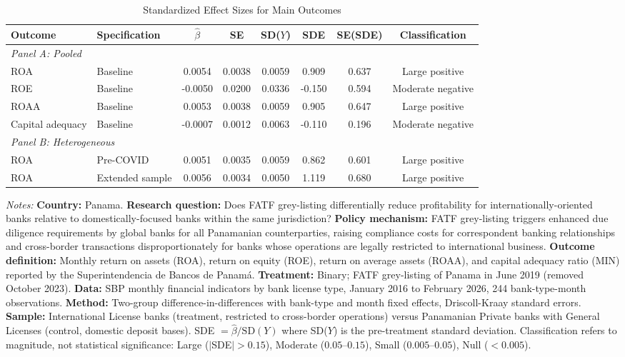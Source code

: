 \begin{table}[H]
\centering
\caption{Standardized Effect Sizes for Main Outcomes}
\label{tab:sde}
\begin{adjustbox}{max width=\textwidth}
\begin{threeparttable}
\begin{tabular}{llcccccc}
\toprule
Outcome & Specification & $\hat{\beta}$ & SE & SD($Y$) & SDE & SE(SDE) & Classification \\
\midrule
\multicolumn{8}{l}{\textit{Panel A: Pooled}} \\
ROA & Baseline & 0.0054 & 0.0038 & 0.0059 & 0.909 & 0.637 & Large positive \\
ROE & Baseline & -0.0050 & 0.0200 & 0.0336 & -0.150 & 0.594 & Moderate negative \\
ROAA & Baseline & 0.0053 & 0.0038 & 0.0059 & 0.905 & 0.647 & Large positive \\
Capital adequacy & Baseline & -0.0007 & 0.0012 & 0.0063 & -0.110 & 0.196 & Moderate negative \\
\midrule
\multicolumn{8}{l}{\textit{Panel B: Heterogeneous}} \\
ROA & Pre-COVID & 0.0051 & 0.0035 & 0.0059 & 0.862 & 0.601 & Large positive \\
ROA & Extended sample & 0.0056 & 0.0034 & 0.0050 & 1.119 & 0.680 & Large positive \\
\bottomrule
\end{tabular}
\begin{tablenotes}[flushleft]
\scriptsize\raggedright
\item \textit{Notes:} \textbf{Country:} Panama. \textbf{Research question:} Does FATF grey-listing differentially reduce profitability for internationally-oriented banks relative to domestically-focused banks within the same jurisdiction? \textbf{Policy mechanism:} FATF grey-listing triggers enhanced due diligence requirements by global banks for all Panamanian counterparties, raising compliance costs for correspondent banking relationships and cross-border transactions disproportionately for banks whose operations are legally restricted to international business. \textbf{Outcome definition:} Monthly return on assets (ROA), return on equity (ROE), return on average assets (ROAA), and capital adequacy ratio (MIN) reported by the Superintendencia de Bancos de Panam\'a. \textbf{Treatment:} Binary; FATF grey-listing of Panama in June 2019 (removed October 2023). \textbf{Data:} SBP monthly financial indicators by bank license type, January 2016 to February 2026, 244 bank-type-month observations. \textbf{Method:} Two-group difference-in-differences with bank-type and month fixed effects, Driscoll-Kraay standard errors. \textbf{Sample:} International License banks (treatment, restricted to cross-border operations) versus Panamanian Private banks with General Licenses (control, domestic deposit bases). SDE $= \hat{\beta} / \text{SD}(Y)$ where SD($Y$) is the pre-treatment standard deviation. Classification refers to magnitude, not statistical significance: Large ($|$SDE$| > 0.15$), Moderate ($0.05$--$0.15$), Small ($0.005$--$0.05$), Null ($< 0.005$).

\end{tablenotes}
\end{threeparttable}
\end{adjustbox}
\end{table}
